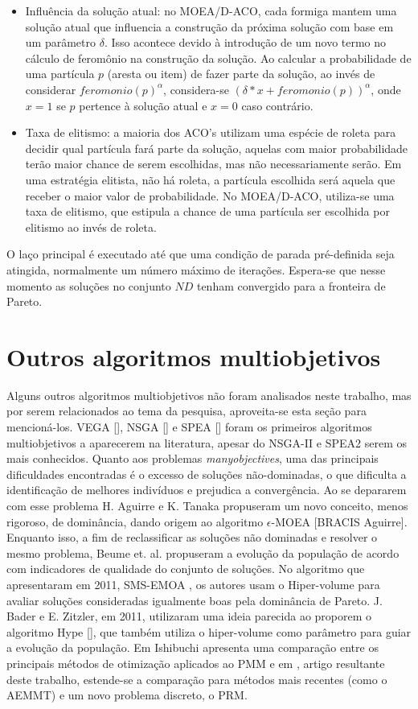 \begin{itemize}
	\item Influência da solução atual: no MOEA/D-ACO, cada formiga mantem uma solução atual que influencia a construção da próxima solução com base em um parâmetro $\delta$. Isso acontece devido à introdução de um novo termo no cálculo de feromônio na construção da solução. Ao calcular a probabilidade de uma partícula $p$ (aresta ou item) de fazer parte da solução, ao invés de considerar $feromonio(p)^\alpha$, considera-se $(\delta * x + feromonio(p))^\alpha$, onde $x = 1$ se $p$ pertence à solução atual e $x = 0$ caso contrário.
	\item Taxa de elitismo: a maioria dos ACO's utilizam uma espécie de roleta para decidir qual partícula fará parte da solução, aquelas com maior probabilidade terão maior chance de serem escolhidas, mas não necessariamente serão. Em uma estratégia elitista, não há roleta, a partícula escolhida será aquela que receber o maior valor de probabilidade. No MOEA/D-ACO, utiliza-se uma taxa de elitismo, que estipula a chance de uma partícula ser escolhida por elitismo ao invés de roleta.
\end{itemize}

O laço principal é executado até que uma condição de parada pré-definida seja atingida, normalmente um número máximo de iterações. Espera-se que nesse momento as soluções no conjunto $ND$ tenham convergido para a fronteira de Pareto.

\section{Outros algoritmos multiobjetivos}
Alguns outros algoritmos multiobjetivos não foram analisados neste trabalho, mas por serem relacionados ao tema da pesquisa, aproveita-se esta seção para mencioná-los. VEGA [], NSGA [] e SPEA [] foram os primeiros algoritmos multiobjetivos a aparecerem na literatura, apesar do NSGA-II e SPEA2 serem os mais conhecidos. Quanto aos problemas \textit{manyobjectives}, uma das principais dificuldades encontradas é o excesso de soluções não-dominadas, o que dificulta a identificação de melhores indivíduos e prejudica a convergência. Ao se depararem com esse problema H. Aguirre e K. Tanaka propuseram um novo conceito, menos rigoroso, de dominância, dando origem ao algoritmo $\epsilon$-MOEA [BRACIS Aguirre]. Enquanto isso, a fim de reclassificar as soluções não dominadas e resolver o mesmo problema, Beume et. al. propuseram a evolução da população de acordo com indicadores de qualidade do conjunto de soluções. No algoritmo que apresentaram em 2011, SMS-EMOA \cite{Beume2007}, os autores usam o Hiper-volume para avaliar soluções consideradas igualmente boas pela dominância de Pareto. J. Bader e E. Zitzler, em 2011, utilizaram uma ideia parecida ao proporem o algoritmo Hype [], que também utiliza o hiper-volume como parâmetro para guiar a evolução da população. Em \cite{Ishibuchi2015} Ishibuchi apresenta uma comparação entre os principais métodos de otimização aplicados ao PMM e em \cite{Franca2017}, artigo resultante deste trabalho, estende-se a comparação para métodos mais recentes (como o AEMMT) e um novo problema discreto, o PRM.

